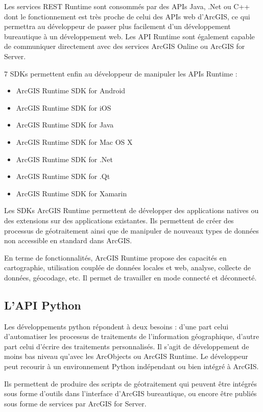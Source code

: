 \documentclass[11pt]{article}
\begin{document}
Les services REST Runtime sont consommés par des APIs Java, .Net ou C++ dont le fonctionnement est très proche de celui des APIs web d'ArcGIS, ce qui permettra au développeur de passer plus facilement d'un développement bureautique à un développement web. Les API Runtime sont également capable de communiquer directement avec des services ArcGIS Online ou ArcGIS for Server.

7 SDKs permettent enfin au développeur de manipuler les APIs Runtime :
\begin{itemize}
	\item ArcGIS Runtime SDK for Android
	\item ArcGIS Runtime SDK for iOS
	\item ArcGIS Runtime SDK for Java
	\item ArcGIS Runtime SDK for Mac OS X
	\item ArcGIS Runtime SDK for .Net
	\item ArcGIS Runtime SDK for .Qt
	\item ArcGIS Runtime SDK for Xamarin
\end{itemize}

Les SDKs ArcGIS Runtime permettent de développer des applications natives ou des extensions sur des applications existantes. Ils permettent de créer des processus de géotraitement ainsi que de manipuler de nouveaux types de données non accessible en standard dans ArcGIS.

En terme de fonctionnalités, ArcGIS Runtime propose des capacités en cartographie, utilisation couplée de données locales et web, analyse, collecte de données, géocodage,  etc. Il permet de travailler en mode connecté et déconnecté.


\subsection{L'API Python}
Les développements python répondent à deux besoins : d’une part celui d’automatiser les processus de traitements de l’information géographique, d’autre part celui d’écrire des traitements personnalisés. Il s'agit de développement de moins bas niveau qu'avec les ArcObjects ou ArcGIS Runtime. Le développeur peut recourir à un environnement Python indépendant ou bien intégré à ArcGIS.

Ils permettent de produire des scripts de géotraitement qui peuvent être intégrés sous forme d’outils dans l’interface d’ArcGIS bureautique, ou encore être publiés sous forme de services par ArcGIS for Server.
\end{document}
